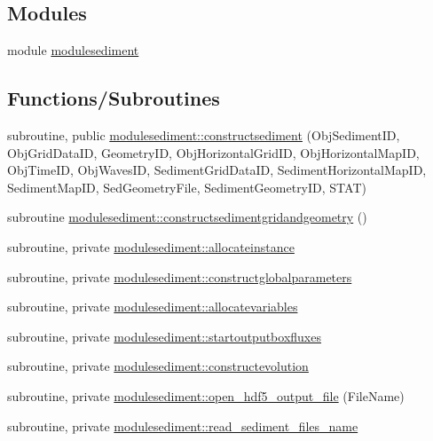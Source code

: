 \subsection*{Modules}
\begin{DoxyCompactItemize}
\item 
module \mbox{\hyperlink{namespacemodulesediment}{modulesediment}}
\end{DoxyCompactItemize}
\subsection*{Functions/\+Subroutines}
\begin{DoxyCompactItemize}
\item 
subroutine, public \mbox{\hyperlink{namespacemodulesediment_a1a3b01f7483f6fefc6f2dac6a51d664c}{modulesediment\+::constructsediment}} (Obj\+Sediment\+ID, Obj\+Grid\+Data\+ID, Geometry\+ID, Obj\+Horizontal\+Grid\+ID, Obj\+Horizontal\+Map\+ID, Obj\+Time\+ID, Obj\+Waves\+ID, Sediment\+Grid\+Data\+ID, Sediment\+Horizontal\+Map\+ID, Sediment\+Map\+ID, Sed\+Geometry\+File, Sediment\+Geometry\+ID, S\+T\+AT)
\item 
subroutine \mbox{\hyperlink{namespacemodulesediment_a4fcfee70467ab31177134369a945bf94}{modulesediment\+::constructsedimentgridandgeometry}} ()
\item 
subroutine, private \mbox{\hyperlink{namespacemodulesediment_a7cf40ca051d012f054efecd59d7ffb97}{modulesediment\+::allocateinstance}}
\item 
subroutine, private \mbox{\hyperlink{namespacemodulesediment_a58c9978541dc90a336fa76f940b8061b}{modulesediment\+::constructglobalparameters}}
\item 
subroutine, private \mbox{\hyperlink{namespacemodulesediment_a7feb9a14efb0c8cc97dfc870ff9804ce}{modulesediment\+::allocatevariables}}
\item 
subroutine, private \mbox{\hyperlink{namespacemodulesediment_ac07e155e923f9f500063126c9e4f7ede}{modulesediment\+::startoutputboxfluxes}}
\item 
subroutine, private \mbox{\hyperlink{namespacemodulesediment_a65ecb7c9b87860dde4303791884a9956}{modulesediment\+::constructevolution}}
\item 
subroutine, private \mbox{\hyperlink{namespacemodulesediment_afe850b14e10e8db70a1bd5879fc5c2ea}{modulesediment\+::open\+\_\+hdf5\+\_\+output\+\_\+file}} (File\+Name)
\item 
subroutine, private \mbox{\hyperlink{namespacemodulesediment_ae14a9f4cd6513444502e3774b27d6f2e}{modulesediment\+::read\+\_\+sediment\+\_\+files\+\_\+name}}

\end{DoxyCompactItemize}

